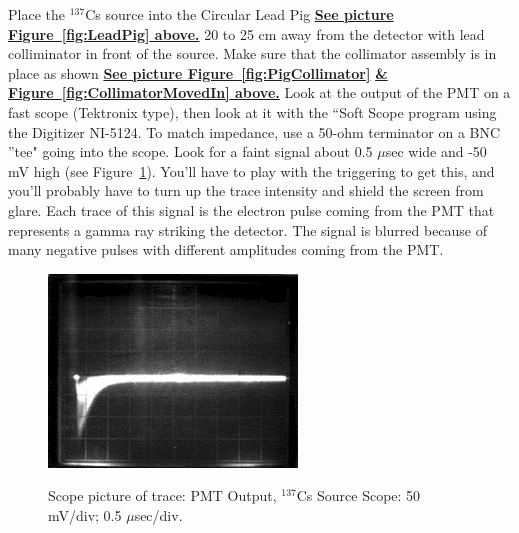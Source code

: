 \documentclass{../lab}
\begin{document}
\begin{enumerate}
    Place the $^{137}$Cs source into the Circular Lead Pig \href{http://experimentationlab.berkeley.edu/sites/default/files/images/GMA_Pig_3536-Lg.jpg}{\textbf{See picture Figure~\ref{fig:LeadPig} above.}} 20 to 25 cm away from the detector with lead colliminator in front of the source. Make sure that the collimator assembly is in place as shown \href{http://experimentationlab.berkeley.edu/sites/default/files/images/GMA_Layout_3537-Lg.jpg}{\textbf{See picture Figure~\ref{fig:PigCollimator}}} \href{http://experimentationlab.berkeley.edu/sites/default/files/images/GMA_Layout_3538-Lg.jpg}{\textbf{\& Figure~\ref{fig:CollimatorMovedIn} above.}} Look at the output of the PMT on a fast scope (Tektronix type), then look at it with the ``Soft Scope program using the Digitizer NI-5124. To match impedance, use a 50-ohm terminator on a BNC ''tee" going into the scope. Look for a faint signal about 0.5 $\mu$sec wide and -50 mV high (see Figure~\ref{fig:250px-GMAimage003}). You'll have to play with the triggering to get this, and you'll probably have to turn up the trace intensity and shield the screen from glare. Each trace of this signal is the electron pulse coming from the PMT that represents a gamma ray striking the detector. The signal is blurred because of many negative pulses with different amplitudes coming from the PMT.

    \begin{figure}[h]
        \centering
        \href{http://experimentationlab.berkeley.edu/sites/default/files/images/250px-GMAimage003.gif}{\includegraphics[width=0.5\linewidth]{images/250px-GMAimage003.png}}
        \caption{Scope picture of trace: PMT Output, $^{137}$Cs Source Scope: 50 mV/div; 0.5 $\mu$sec/div.}
        \label{fig:250px-GMAimage003}
    \end{figure}


\end{enumerate}
\end{document}

